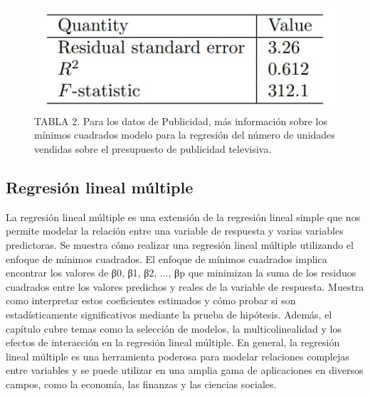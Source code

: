 \documentclass[
  letterpaper,
  DIV=11,
  numbers=noendperiod]{scrartcl}
\begin{document}
\begin{figure}

{\centering \includegraphics{images/tab2.jpg}

}

\caption{TABLA 2. Para los datos de Publicidad, más información sobre
los mínimos cuadrados modelo para la regresión del número de unidades
vendidas sobre el presupuesto de publicidad televisiva.}

\end{figure}

\hypertarget{regresiuxf3n-lineal-muxfaltiple}{%
\subsection{Regresión lineal
múltiple}\label{regresiuxf3n-lineal-muxfaltiple}}

La regresión lineal múltiple es una extensión de la regresión lineal
simple que nos permite modelar la relación entre una variable de
respuesta y varias variables predictoras. Se muestra cómo realizar una
regresión lineal múltiple utilizando el enfoque de mínimos cuadrados. El
enfoque de mínimos cuadrados implica encontrar los valores de β0, β1,
β2, ..., βp que minimizan la suma de los residuos cuadrados entre los
valores predichos y reales de la variable de respuesta. Muestra como
interpretar estos coeficientes estimados y cómo probar si son
estadísticamente significativos mediante la prueba de hipótesis. Además,
el capítulo cubre temas como la selección de modelos, la
multicolinealidad y los efectos de interacción en la regresión lineal
múltiple. En general, la regresión lineal múltiple es una herramienta
poderosa para modelar relaciones complejas entre variables y se puede
utilizar en una amplia gama de aplicaciones en diversos campos, como la
economía, las finanzas y las ciencias sociales.
\end{document}
